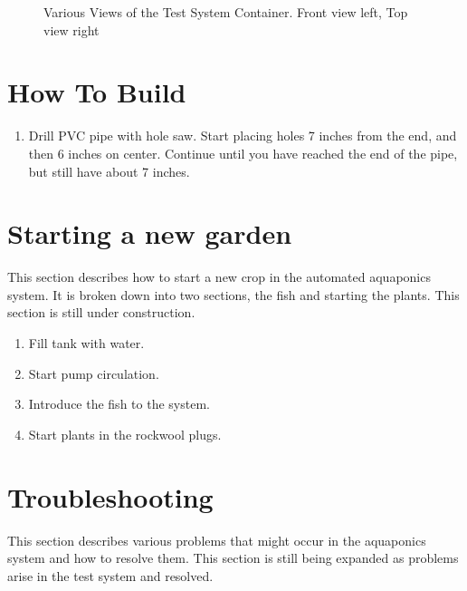 \documentclass[american,12pt]{article}
\begin{document}
\begin{figure}[h]
    \centering
    \caption{Various Views of the Test System Container. Front view left, Top
    view right}
    \label{fig:views}
\end{figure}

\section{How To Build}
\begin{enumerate}
    \item Drill PVC pipe with hole saw. Start placing holes 7 inches from the
        end, and then 6 inches on center. Continue until you have reached
        the end of the pipe, but still have about 7 inches.
\end{enumerate}


\section{Starting a new garden}
This section describes how to start a new crop in the automated aquaponics
system. It is broken down into two sections, the fish and starting the plants.
This section is still under construction.

\begin{enumerate}
    \item Fill tank with water.
    \item Start pump circulation.
    \item Introduce the fish to the system.
    \item Start plants in the rockwool plugs.
\end{enumerate}

\section{Troubleshooting}
This section describes various problems that might occur in the 
aquaponics system and how to resolve them. This section is still
being expanded as problems arise in the test system and
resolved.
\end{document}
